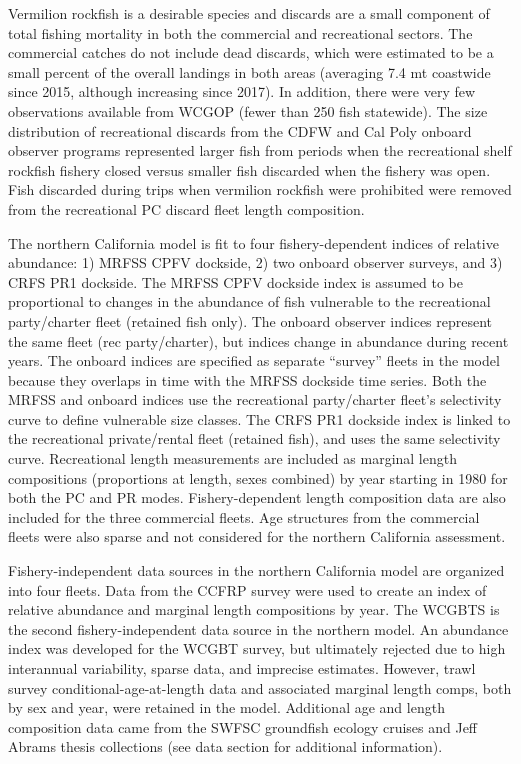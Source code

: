 \documentclass[11pt,
  english,
]{article}
\begin{document}
Vermilion rockfish is a desirable species and discards are a small component of total fishing mortality in both the commercial and recreational sectors. The commercial catches do not include dead discards, which were estimated to be a small percent of the overall landings in both areas (averaging 7.4 mt coastwide since 2015, although increasing since 2017). In addition, there were very few observations available from WCGOP (fewer than 250 fish statewide). The size distribution of recreational discards from the CDFW and Cal Poly onboard observer programs represented larger fish from periods when the recreational shelf rockfish fishery closed versus smaller fish discarded when the fishery was open. Fish discarded during trips when vermilion rockfish were prohibited were removed from the recreational PC discard fleet length composition.

The northern California model is fit to four fishery-dependent indices of relative abundance: 1) MRFSS CPFV dockside, 2) two onboard observer surveys, and 3) CRFS PR1 dockside. The MRFSS CPFV dockside index is assumed to be proportional to changes in the abundance of fish vulnerable to the recreational party/charter fleet (retained fish only). The onboard observer indices represent the same fleet (rec party/charter), but indices change in abundance during recent years. The onboard indices are specified as separate ``survey'' fleets in the model because they overlaps in time with the MRFSS dockside time series. Both the MRFSS and onboard indices use the recreational party/charter fleet's selectivity curve to define vulnerable size classes. The CRFS PR1 dockside index is linked to the recreational private/rental fleet (retained fish), and uses the same selectivity curve. Recreational length measurements are included as marginal length compositions (proportions at length, sexes combined) by year starting in 1980 for both the PC and PR modes. Fishery-dependent length composition data are also included for the three commercial fleets. Age structures from the commercial fleets were also sparse and not considered for the northern California assessment.

Fishery-independent data sources in the northern California model are organized into four fleets. Data from the CCFRP survey were used to create an index of relative abundance and marginal length compositions by year. The WCGBTS is the second fishery-independent data source in the northern model. An abundance index was developed for the WCGBT survey, but ultimately rejected due to high interannual variability, sparse data, and imprecise estimates. However, trawl survey conditional-age-at-length data and associated marginal length comps, both by sex and year, were retained in the model. Additional age and length composition data came from the SWFSC groundfish ecology cruises and Jeff Abrams thesis collections (see data section for additional information).
\end{document}
